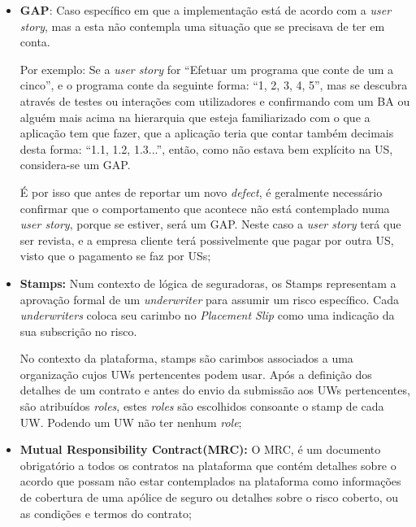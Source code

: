 \begin{itemize}
            \item \textbf{GAP}: Caso específico em que a implementação está de acordo com a \textit{user story}, mas a esta não contempla uma situação que se precisava de ter em conta.
            
            Por exemplo: Se a \textit{user story} for ``Efetuar um programa que conte de um a cinco'', e o programa conte da seguinte forma: ``1, 2, 3, 4, 5'', mas se descubra através de testes ou interações com utilizadores e confirmando com um BA ou alguém mais acima na hierarquia que esteja familiarizado com o que a aplicação tem que fazer, que a aplicação teria que contar também decimais desta forma: ``1.1, 1.2, 1.3...'', então, como não estava bem explícito na US, considera-se um GAP.
            
            É por isso que antes de reportar um novo \textit{defect}, é geralmente necessário confirmar que o comportamento que acontece não está contemplado numa \textit{user story}, porque se estiver, será um GAP. Neste caso a \textit{user story} terá que ser revista, e a empresa cliente terá possivelmente que pagar por outra US, visto que o pagamento se faz por USs;
            
            \item \textbf{Stamps:} Num contexto de lógica de seguradoras, os Stamps representam a aprovação formal de um \textit{underwriter} para assumir um risco específico. Cada \textit{underwriters} coloca seu carimbo no \textit{Placement Slip} como uma indicação da sua subscrição no risco.

            No contexto da plataforma, stamps são carimbos associados a uma organização cujos UWs pertencentes podem usar. Após a definição dos detalhes de um contrato e antes do envio da submissão aos UWs pertencentes, são atribuídos \textit{roles}, estes \textit{roles} são escolhidos consoante o stamp de cada UW. Podendo um UW não ter nenhum \textit{role};
                
            \item \textbf{Mutual Responsibility Contract(MRC):} O MRC, é um documento obrigatório a todos os contratos na plataforma que contém detalhes sobre o acordo que possam não estar contemplados na plataforma como informações de cobertura de uma apólice de seguro ou detalhes sobre o risco coberto, ou as condições e termos do contrato;


\end{itemize}
